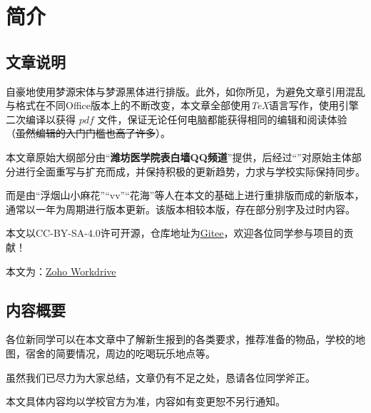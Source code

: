 \chapter[简介]{简介}
\section[文章说明]{文章说明}

自豪地使用梦源宋体与梦源黑体进行排版。此外，如你所见，为避免文章引用混乱与格式在不同Office版本上的不断改变，本文章全部使用\textit{\TeX}语言写作，使用\textit{\XeLaTeX}引擎二次编译以获得 $pdf$ 文件，保证无论任何电脑都能获得相同的编辑和阅读体验（\sout{虽然编辑的入门门槛也高了许多}）。

本文章原始大纲部分由“\textbf{潍坊医学院表白墙QQ频道}”提供，后经过“\textbf{}”对原始主体部分进行全面重写与扩充而成，并保持积极的更新趋势，力求与学校实际保持同步。

而\textbf{}是由“浮烟山小麻花”“vv”“花海”等人在本文的基础上进行重排版而成的新版本，通常以一年为周期进行版本更新。该版本相较本版，存在部分别字及过时内容。

\bigbreak
\textbf{}

本文以CC-BY-SA-4.0许可开源，仓库地址为\uline{\href{https://gitee.com/mikazo/guide_for_freshman}{Gitee}}，欢迎各位同学参与项目的贡献！

本文\textbf{}为：\uline{\href{https://workdrive.zohoexternal.com/folder/sx5ijbbd2ad4d669c4c358d59fe314410aaf4}{Zoho Workdrive}}

\section[内容概要]{内容概要}

各位新同学可以在本文章中了解新生报到的各类要求，推荐准备的物品，学校的地图，宿舍的简要情况，周边的吃喝玩乐地点等。

虽然我们已尽力为大家总结，文章仍有不足之处，恳请各位同学斧正。

本文具体内容均以学校官方为准，内容如有变更恕不另行通知。